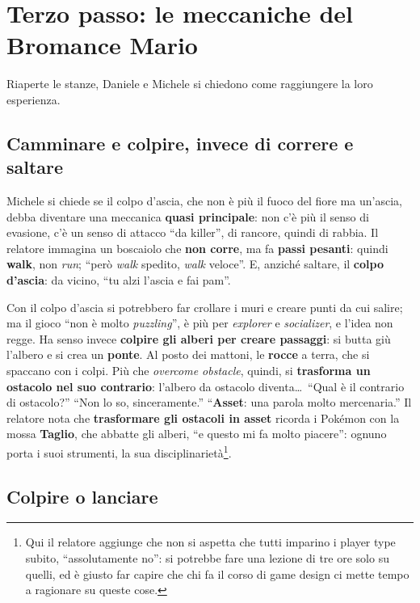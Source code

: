 \section{Terzo passo: le meccaniche del Bromance Mario}
\label{z7:sec:bromance-meccaniche}

Riaperte le stanze, Daniele e Michele si chiedono come raggiungere la loro
esperienza.

\subsection{Camminare e colpire, invece di correre e saltare}

Michele si chiede se il colpo d'ascia, che non è più il fuoco del fiore ma
un'ascia, debba diventare una meccanica \textbf{quasi principale}: non c'è più il
senso di evasione, c'è un senso di attacco ``da killer'', di rancore, quindi di
rabbia. Il relatore immagina un boscaiolo che \textbf{non corre}, ma fa
\textbf{passi pesanti}: quindi \textbf{walk}, non \emph{run}; ``però
\emph{walk} spedito, \emph{walk} veloce''. E, anziché saltare, il \textbf{colpo
d'ascia}: da vicino, ``tu alzi l'ascia e fai pam''.

Con il colpo d'ascia si potrebbero far crollare i muri e creare punti da cui
salire; ma il gioco ``non è molto \emph{puzzling}'', è più per \emph{explorer} e
\emph{socializer}, e l'idea non regge. Ha senso invece \textbf{colpire gli alberi
per creare passaggi}: si butta giù l'albero e si crea un \textbf{ponte}. Al posto
dei mattoni, le \textbf{rocce} a terra, che si spaccano con i colpi. Più che
\emph{overcome obstacle}, quindi, si \textbf{trasforma un ostacolo nel suo
contrario}: l'albero da ostacolo diventa\dots\ ``Qual è il contrario di
ostacolo?'' ``Non lo so, sinceramente.'' ``\textbf{Asset}: una parola molto
mercenaria.'' Il relatore nota che \textbf{trasformare gli ostacoli in asset}
ricorda i Pokémon con la mossa \textbf{Taglio}, che abbatte gli alberi, ``e questo
mi fa molto piacere'': ognuno porta i suoi strumenti, la sua
disciplinarietà\footnote{Qui il relatore aggiunge che non si aspetta che tutti
imparino i player type subito, ``assolutamente no'': si potrebbe fare una lezione di
tre ore solo su quelli, ed è giusto far capire che chi fa il corso di game design
ci mette tempo a ragionare su queste cose.}.

\subsection{Colpire o lanciare}

